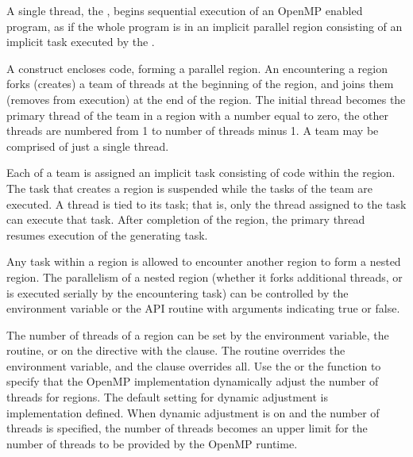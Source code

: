\label{chap:parallel_execution}

A single thread, the , begins sequential execution of 
an OpenMP enabled program, as if the whole program is in an implicit parallel
region consisting of an implicit task executed by the .

A  construct encloses code, 
forming a parallel region.  An  encountering a  
region forks (creates) a team of threads at the beginning of the 
 region, and joins them (removes from execution) at the 
end of the region.  The initial thread becomes the primary thread of the team in a 
 region with a  number equal to zero, the other 
threads are numbered from 1 to number of threads minus 1. 
A team may be comprised of just a single thread.

Each  of a team is assigned an implicit task consisting of code within the 
 region. The task that creates a  region is suspended while the
tasks of the team are executed.  A thread is tied to its task; that is,
only the thread assigned to the task can execute that task.  After completion 
of the  region, the primary thread resumes execution of the generating task.  


Any task within a  region is allowed to encounter another
 region to form a nested  region. The 
parallelism of a nested  region (whether it forks additional 
threads, or is executed serially by the encountering task) can be controlled by the
 environment variable or the  
API routine with arguments indicating true or false.

The number of threads of a  region can be set by the 
environment variable, the  routine, or on the  
directive with the 
clause. The routine overrides the environment variable, and the clause overrides all. 
Use the 
or the  function to specify that the OpenMP
implementation dynamically adjust the number of threads for
 regions. The default setting for dynamic adjustment is implementation
defined. When dynamic adjustment is on and the number of threads is specified,
the number of threads becomes an upper limit for the number of threads to be
provided by the OpenMP runtime.

